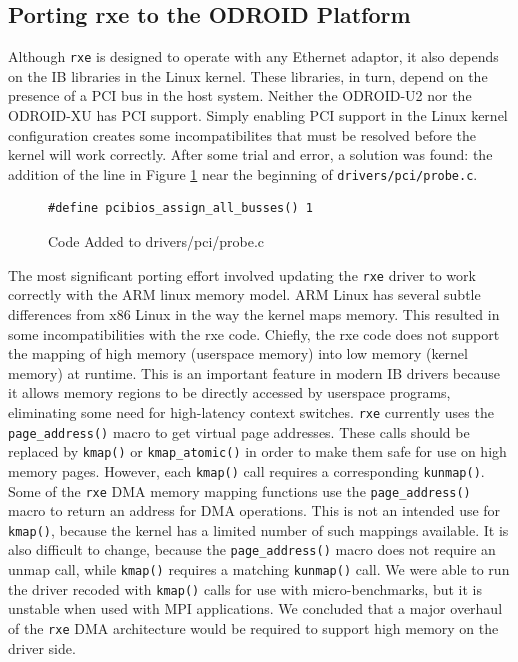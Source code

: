 \documentclass[11pt]{book}
\begin{document}
\subsection{Porting rxe to the ODROID Platform}

Although \verb;rxe; is designed to operate with any Ethernet adaptor, it also depends on
the IB libraries in the Linux kernel.  These libraries, in turn, depend on the presence of
a PCI bus in the host system.  Neither the ODROID-U2 nor the ODROID-XU has PCI support.
Simply enabling PCI support in the Linux kernel configuration creates some
incompatibilites that must be resolved before the kernel will work correctly.  After some
trial and error, a solution was found: the addition of the line in Figure \ref{pci_code}
near the beginning of \verb;drivers/pci/probe.c;.

\begin{figure}
\centering
\begin{verbatim}
#define pcibios_assign_all_busses() 1
\end{verbatim}
\caption{Code Added to drivers/pci/probe.c}\label{pci_code}
\end{figure}

The most significant porting effort involved updating the \verb;rxe; driver to work
correctly with the ARM linux memory model.  ARM Linux has several subtle differences from
x86 Linux in the way the kernel maps memory.  This resulted in some incompatibilities with
the rxe code.  Chiefly, the rxe code does not support the mapping of high memory
(userspace memory) into low memory (kernel memory) at runtime.  This is an important
feature in modern IB drivers because it allows memory regions to be directly accessed by
userspace programs, eliminating some need for high-latency context switches.  \verb;rxe;
currently uses the \verb;page_address(); macro to get virtual page addresses.  These calls
should be replaced by \verb;kmap(); or \verb;kmap_atomic(); in order to make them safe for
use on high memory pages.  However, each \verb;kmap(); call requires a corresponding
\verb;kunmap();.  Some of the \verb;rxe; DMA memory mapping functions use the
\verb;page_address(); macro to return an address for DMA operations.  This is not an
intended use for \verb;kmap();, because the kernel has a limited number of such mappings
available.  It is also difficult to change, because the \verb;page_address(); macro does
not require an unmap call, while \verb;kmap(); requires a matching \verb;kunmap(); call.
We were able to run the driver recoded with \verb;kmap(); calls for use with
micro-benchmarks, but it is unstable when used with MPI applications.  We concluded that a
major overhaul of the \verb;rxe; DMA architecture would be required to support high memory
on the driver side.
\end{document}
